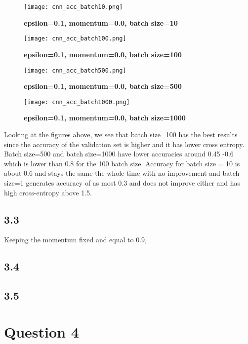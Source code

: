 \documentclass[10pt]{article}
\begin{document}
\begin{figure}[H]
	\centering
	\texttt{[image: cnn\_acc\_batch10.png]}
	\caption{\textbf{epsilon=0.1, momentum=0.0, batch size=10}}
	\label{fig:}
\end{figure}

\begin{figure}[H]
	\centering
	\texttt{[image: cnn\_acc\_batch100.png]}
	\caption{\textbf{epsilon=0.1, momentum=0.0, batch size=100}}
	\label{fig:}
\end{figure}


\begin{figure}[H]
	\centering
	\texttt{[image: cnn\_acc\_batch500.png]}
	\caption{\textbf{epsilon=0.1, momentum=0.0, batch size=500}}
	\label{fig:}
\end{figure}


\begin{figure}[H]
	\centering
	\texttt{[image: cnn\_acc\_batch1000.png]}
	\caption{\textbf{epsilon=0.1, momentum=0.0, batch size=1000}}
	\label{fig:}
\end{figure}

Looking at the figures above, we see that batch size=100 has the best results since the accuracy of the validation set is higher and it has lower cross entropy. Batch size=500 and batch size=1000 have lower accuracies around 0.45 -0.6 which is lower than 0.8 for the 100 batch size. Accuracy for batch size = 10 is about 0.6 and stays the same the whole time with no improvement and batch size=1 generates accuracy of as most 0.3 and does not improve either and has high cross-entropy above 1.5.




\subsection*{3.3}
Keeping the momentum fixed and equal to 0.9,



\subsection*{3.4}

\subsection*{3.5}

\section*{Question 4}
\end{document}
